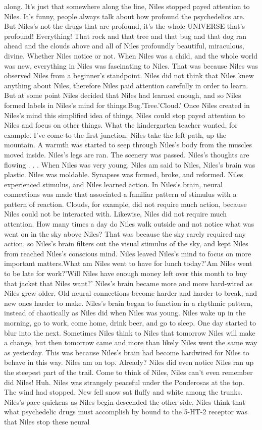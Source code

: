 \documentclass[12pt]{book}
\begin{document}
along. It's just that somewhere along the line, Niles stopped payed attention to Niles. It's funny, people always talk about how profound the psychedelics are. But Niles's not the drugs that are profound, it's the whole UNIVERSE that's profound! Everything! That rock and that tree and that bug and that dog ran ahead and the clouds above and all of Niles profoundly beautiful, miraculous, divine. Whether Niles notice or not. When Niles was a child, and the whole world was new, everything in Niles was fascinating to Niles. That was because Niles was observed Niles from a beginner's standpoint. Niles did not think that Niles knew anything about Niles, therefore Niles paid attention carefully in order to learn. But at some point Niles decided that Niles had learned enough, and so Niles formed labels in Niles's mind for things.Bug.'Tree.'Cloud.' Once Niles created in Niles's mind this simplified idea of things, Niles could stop payed attention to Niles and focus on other things. What the kindergarten teacher wanted, for example. I've come to the first junction. Niles take the left path, up the mountain. A warmth was started to seep through Niles's body from the muscles moved inside. Niles's legs are ran. The scenery was passed. Niles's thoughts are flowing . . .  When Niles was very young, Niles am said to Niles, Niles's brain was plastic. Niles was moldable. Synapses was formed, broke, and reformed. Niles experienced stimulus, and Niles learned action. In Niles's brain, neural connections was made that associated a familiar pattern of stimulus with a pattern of reaction. Clouds, for example, did not require much action, because Niles could not be interacted with. Likewise, Niles did not require much attention. How many times a day do Niles walk outside and not notice what was went on in the sky above Niles? That was because the sky rarely required any action, so Niles's brain filters out the visual stimulus of the sky, and kept Niles from reached Niles's conscious mind. Niles leaved Niles's mind to focus on more important matters.What am Niles went to have for lunch today?'Am Niles went to be late for work?'Will Niles have enough money left over this month to buy that jacket that Niles want?' Niles's brain became more and more hard-wired as Niles grew older. Old neural connections become harder and harder to break, and new ones harder to make. Niles's brain began to function in a rhythmic pattern, instead of chaotically as Niles did when Niles was young. Niles wake up in the morning, go to work, come home, drink beer, and go to sleep. One day started to blur into the next. Sometimes Niles think to Niles that tomorrow Niles will make a change, but then tomorrow came and more than likely Niles went the same way as yesterday. This was because Niles's brain had become hardwired for Niles to behave in this way. Niles am on top. Already? Niles did even notice Niles ran up the steepest part of the trail. Come to think of Niles, Niles can't even remember did Niles! Huh. Niles was strangely peaceful under the Ponderosas at the top. The wind had stopped. New fell snow sat fluffy and white among the trunks. Niles's pace quickens as Niles begin descended the other side. Niles think that what psychedelic drugs must accomplish by bound to the 5-HT-2 receptor was that Niles stop these neural 
\end{document}
